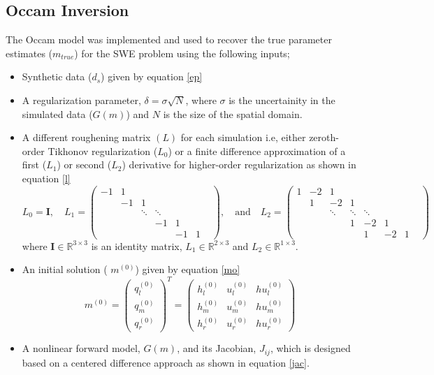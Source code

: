 \documentclass[12pt,a4paper]{article}
\begin{document}
	\subsection{Occam Inversion}
	The Occam model was implemented and used to recover the true parameter estimates  ($m_{true}$) for the SWE problem using the following inputs;
	\begin{itemize}
		\item  Synthetic data ($d_s$) given by equation \eqref{ep}
		\item A regularization parameter, $\delta = \sigma \sqrt{N}$, where  $\sigma$ is the uncertainity in the simulated data ($G(m) $) and $N$ is the size of the spatial domain.
		
		\item A different roughening matrix $(L) $ for  each simulation i.e, either zeroth-order Tikhonov regularization ($L_0$) or a finite difference approximation of a first ($L_1$) or second ($L_2$) derivative for higher-order regularization as shown in equation \eqref{l}
		\begin{equation}
			L_0 = \mathbf{I}, \quad
			L_1 = \left(\begin{smallmatrix}
				-1 &  1&  & & & & \\
				    & -1& 1 & & & &\\
				    &   &  \ddots  &\ddots & & & \\
				    &   &    & -1& 1& &\\
				    &   &    & &-1 & 1&
			\end{smallmatrix}\right),\quad \text{and} \quad
			L_2 = \left(\begin{smallmatrix}
				1 &  -2&  1& & & &  &\\
				& 1& -2 &1 & & & &\\
				&  & \ddots&  \ddots  &\ddots & & & \\
				&   &   &  1& -2& 1& & \\
				&   &   & & 1&-2& 1& 
		\end{smallmatrix}\right)
			\label{l}
		\end{equation}
		where  $\mathbf{I} \in \mathbb{R}^{3\times 3}$ is an identity matrix, $L_1 \in  \mathbb{R}^{2\times 3}$ and $L_2 \in  \mathbb{R}^{1\times 3}$.
		\item  An initial solution ( $m^{(0)}$) given by equation \eqref{mo} 
		\begin{equation}
			m^{(0)} = 	\begin{pmatrix}
				q_l^{(0)} \\
				q_m^{(0)}  \\
				q_r ^{(0)}
			\end{pmatrix}^T=\begin{pmatrix}
				h_l^{(0)} & u_l^{(0)}& hu_l^{(0)} \\
				h_m^{(0)}  & u_m^{(0)} & hu_m^{(0)} \\
				h_r^{(0)} & u_r^{(0)}& hu_r^{(0)}
			\end{pmatrix}
			\label{mo}
		\end{equation}
	\item   A nonlinear forward model, $G(m) $,  and its Jacobian, $J_{ij}$, which is designed based on a centered difference approach as shown in equation \eqref{jac}.
	

\end{itemize}
\end{document}
